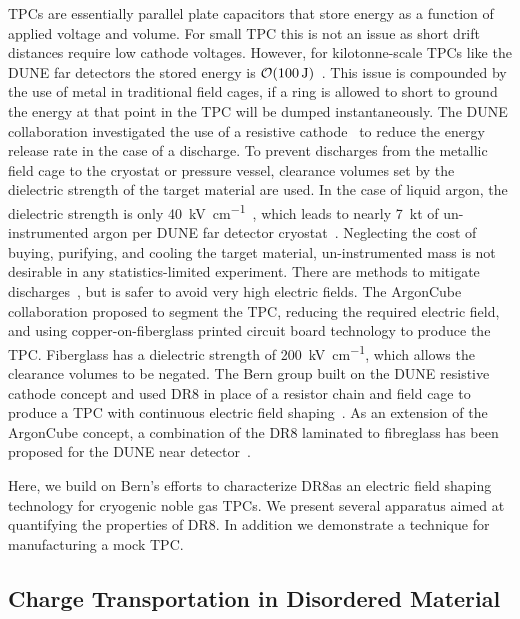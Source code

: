 \documentclass[a4paper,12pt]{article}
\newcommand{\DR}{DR8}
\begin{document}
TPCs are essentially parallel plate capacitors that store energy as a function of applied voltage and volume. 
For small TPC this is not an issue as short drift distances require low cathode voltages.
However, for kilotonne-scale TPCs like the DUNE far detectors the stored energy is $\order{\SI{100}{\joule}}$~\cite{Acciarri:2016ooe}.
This issue is compounded by the use of metal in traditional field cages, if a ring is allowed to short to ground the energy at that point in the TPC will be dumped instantaneously. 
The DUNE collaboration investigated the use of a resistive cathode~\cite{DUNE:2017pqt} to reduce the energy release rate in the case of a discharge.
To prevent discharges from the metallic field cage to the cryostat or pressure vessel, clearance volumes set by the dielectric strength of the target material are used. 
In the case of liquid argon, the dielectric strength is only \SI{40}{\kilo\volt\per\centi\metre}~\cite{MicroBooNE:2014php}, which leads to nearly \SI{7}{\kilo\tonne} of un-instrumented argon per DUNE far detector cryostat~\cite{Acciarri:2016ooe}.
Neglecting the cost of buying, purifying, and cooling the target material, un-instrumented mass is not desirable in any statistics-limited experiment.        
There are methods to mitigate discharges~\cite{Auger:2014eba}, but is safer to avoid very high electric fields.  
The ArgonCube collaboration proposed to segment the TPC, reducing the required electric field, and using copper-on-fiberglass printed circuit board technology to produce the TPC. 
Fiberglass has a dielectric strength of \SI{200}{\kilo\volt\per\centi\metre}, which allows the clearance volumes to be negated.
The Bern group built on the DUNE resistive cathode concept and used {\DR} in place of a resistor chain and field cage to produce a TPC with continuous electric field shaping~\cite{bern_lartpc}.
As an extension of the ArgonCube concept, a combination of the {\DR} laminated to fibreglass has been proposed for the DUNE near detector~\cite{DUNE:2021tad}.   

Here, we build on Bern's efforts to characterize \DR as an electric field shaping technology for cryogenic noble gas TPCs.
We present several apparatus aimed at quantifying the properties of {\DR}. In addition we demonstrate a technique for manufacturing a mock TPC.

\subsection{Charge Transportation in Disordered Material}
\label{sec:disorder_Mattrial}
\end{document}
